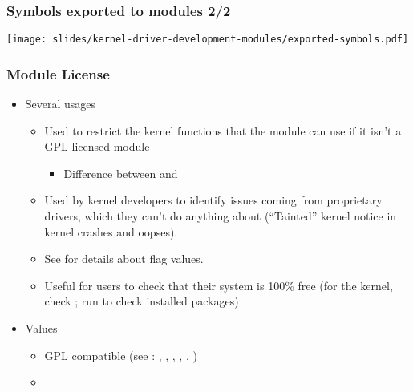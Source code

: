 \begin{frame}
  \frametitle{Symbols exported to modules 2/2}
  \begin{center}
    \texttt{[image: slides/kernel-driver-development-modules/exported-symbols.pdf]}
  \end{center}
\end{frame}

\begin{frame}
  \frametitle{Module License}
  \begin{itemize}
  \item Several usages
    \begin{itemize}
    \item Used to restrict the kernel functions that the module can
      use if it isn't a GPL licensed module
      \begin{itemize}
      \item Difference between  and
      \end{itemize}
    \item Used by kernel developers to identify issues coming from
      proprietary drivers, which they can't do anything about
      (“Tainted” kernel notice in kernel crashes and oopses).
    \item See 
      for details about  flag values.
    \item Useful for users to check that their system is 100\% free
      (for the kernel, check ; run
       to check installed packages)
    \end{itemize}
  \item Values
    \begin{itemize}
    \item GPL compatible (see :
      , , ,
      , , )
    \item {}
    \end{itemize}
  \end{itemize}
\end{frame}

